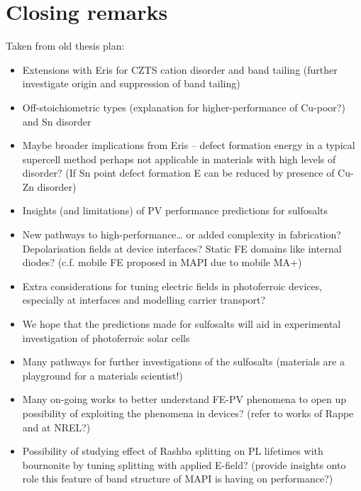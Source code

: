 \documentclass[11pt, twoside]{report}
\begin{document}







\chapter{Closing remarks}

Taken from old thesis plan:
\begin{itemize}
\item Extensions with Eris for CZTS cation disorder and band tailing (further investigate origin and suppression of band tailing)
\item Off-stoichiometric types (explanation for higher-performance of Cu-poor?) and Sn disorder
\item Maybe broader implications from Eris – defect formation energy in a typical supercell method perhaps not applicable in materials with high levels of disorder? (If Sn point defect formation E can be reduced by presence of Cu-Zn disorder)
\item Insights (and limitations) of PV performance predictions for sulfosalts
\item New pathways to high-performance… or added complexity in fabrication? Depolarisation fields at device interfaces? Static FE domains like internal diodes? (c.f. mobile FE proposed in MAPI due to mobile MA+)
\item Extra considerations for tuning electric fields in photoferroic devices, especially at interfaces and modelling carrier transport?
\item We hope that the predictions made for sulfosalts will aid in experimental investigation of photoferroic solar cells
\item Many pathways for further investigations of the sulfosalts (materials are a playground for a materials scientist!)
\item Many on-going works to better understand FE-PV phenomena to open up possibility of exploiting the phenomena in devices? (refer to works of Rappe and at NREL?)
\item Possibility of studying effect of Rashba splitting on PL lifetimes with bournonite by tuning splitting with applied E-field? (provide insights onto role this feature of band structure of MAPI is having on performance?)
\end{itemize}
\end{document}

